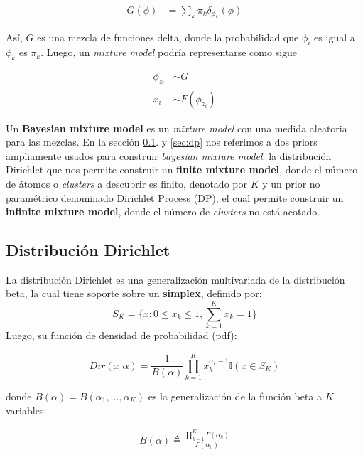 \begin{align}
    G(\phi) & = \sum_{k} \pi_{k}\delta_{\phi_{k}}(\phi)
\end{align}

Así, $G$ es una mezcla de funciones delta, donde la probabilidad que $\bar{\phi_{i}}$ es igual a $\phi_{k}$ es $\pi_{k}$. Luego, un \textit{mixture model} podría representarse como sigue

\begin{align}
\phi_{z_{i}} & \sim G\\
x_{i} & \sim  F(\phi_{z_{i}})
\end{align}

Un \textbf{Bayesian mixture model} es un \textit{mixture model} con una medida aleatoria para las mezclas. En la sección \ref{sec:dirichlet}. y \ref{sec:dp} nos referimos a dos priors ampliamente usados para construir \textit{bayesian mixture model}: la distribución Dirichlet que nos permite construir un \textbf{finite mixture model}, donde el número de átomos o \textit{clusters} a descubrir es finito, denotado por $K$ y un prior no paramétrico denominado Dirichlet Process (DP), el cual permite construir un \textbf{infinite mixture model}, donde el número de \textit{clusters} no está acotado. 

\subsection{Distribución Dirichlet}
\label{sec:dirichlet}

La distribución Dirichlet \citep{minka2000estimating} es una generalización multivariada de la distribución beta, la cual tiene soporte sobre un \textbf{simplex}, definido por:
\begin{equation}
    S_{K} = \{x: 0\leq x_{k} \leq 1, \sum_{k=1}^{K}x_{k}=1\}
\end{equation}
Luego, su función de densidad de probabilidad (pdf):

\begin{equation}
    Dir(x|\alpha)=\frac{1}{B(\alpha)}\prod_{k=1}^{K}x_{k}^{\alpha_{k}-1}\mathbb{I}(x\in S_{K})
\end{equation}

donde $B(\alpha) = B(\alpha_{1}, \ldots, \alpha_{K})$ es la generalización de la función beta a $K$ variables:

\begin{align}
    B(\alpha) \triangleq \frac{\prod_{k=1}^{K}\Gamma(\alpha_{k})}{\Gamma(\alpha_{0})}
\end{align}

